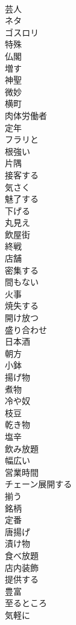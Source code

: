 \documentclass[8pt]{extreport}
\begin{document}
\begin{CJK}{UTF8}{min}
\\	芸人
\\	ネタ
\\	ゴスロリ
\\	特殊
\\	仏閣
\\	増す
\\	神聖
\\	微妙
\\	横町
\\	肉体労働者
\\	定年
\\	フラリと
\\	根強い
\\	片隅
\\	接客する
\\	気さく
\\	魅了する
\\	下げる
\\	丸見え
\\	飲屋街
\\	終戦
\\	店舗
\\	密集する
\\	間もない
\\	火事
\\	焼失する
\\	開け放つ
\\	盛り合わせ
\\	日本酒
\\	朝方
\\	小鉢
\\	揚げ物
\\	煮物
\\	冷や奴
\\	枝豆
\\	乾き物
\\	塩辛
\\	飲み放題
\\	幅広い
\\	営業時間
\\	チェーン展開する
\\	揃う
\\	銘柄
\\	定番
\\	唐揚げ
\\	漬け物
\\	食べ放題
\\	店内装飾
\\	提供する
\\	豊富
\\	至るところ
\\	気軽に

\end{CJK}
\end{document}

